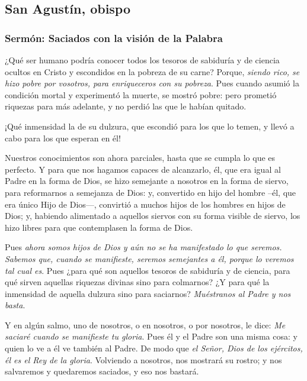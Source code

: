 				\subsection{San Agustín, obispo}
				
					\subsubsection{Sermón: Saciados con la visión de la Palabra}
					
						
						\begin{body}
							¿Qué ser humano podría conocer todos los tesoros de sabiduría y de ciencia ocultos en Cristo y escondidos en la pobreza de su carne? Porque, \emph{siendo rico, se hizo pobre por vosotros, para enriqueceros con su pobreza}. Pues cuando asumió la condición mortal y experimentó la muerte, se mostró pobre: pero prometió riquezas para más adelante, y no perdió las que le habían quitado.
							
							¡Qué inmensidad la de su dulzura, que escondió para los que lo temen, y llevó a cabo para los que esperan en él!
							
							Nuestros conocimientos son ahora parciales, hasta que se cumpla lo que es perfecto. Y para que nos hagamos capaces de alcanzarlo, él, que era igual al Padre en la forma de Dios, se hizo semejante a nosotros en la forma de siervo, para reformarnos a semejanza de Dios: y, convertido en hijo del hombre --él, que era único Hijo de Dios---, convirtió a muchos hijos de los hombres en hijos de Dios; y, habiendo alimentado a aquellos siervos con su forma visible de siervo, los hizo libres para que contemplasen la forma de Dios.
							
							Pues \emph{ahora somos hijos de Dios y aún no se ha manifestado lo que seremos. Sabemos que, cuando se manifieste, seremos semejantes a él, porque lo veremos tal cual es}. Pues ¿para qué son aquellos tesoros de sabiduría y de ciencia, para qué sirven aquellas riquezas divinas sino para colmarnos? ¿Y para qué la inmensidad de aquella dulzura sino para saciarnos? \emph{Muéstranos al Padre y nos basta}.
							
							Y en algún salmo, uno de nosotros, o en nosotros, o por nosotros, le dice: \emph{Me saciaré cuando se manifieste tu gloria}. Pues él y el Padre son una misma cosa: y quien lo ve a él ve también al Padre. De modo que \emph{el Señor, Dios de los ejércitos, él es el Rey de la gloria}. Volviendo a nosotros, nos mostrará su rostro; y nos salvaremos y quedaremos saciados, y eso nos bastará.
							

\end{body}
